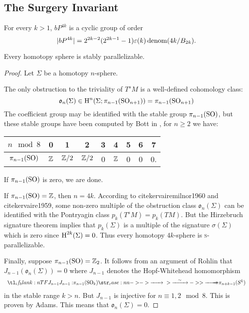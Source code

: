 \subsection{The Surgery Invariant}\label{sec:surgery-invariant}

\begin{theorem}\label{thm:kervaire-milnor}
	For every $k>1$, $bP^{4k}$ is a cyclic group of order
	\[
	  |bP^{4k}| =2^{2k-2}(2^{2k-1}-1)\varepsilon(k)\operatorname{denom}(4k/B_{2k}).
	\]
\end{theorem}

\begin{theorem}\label{thm:kervaire-invariant-problem}
\end{theorem}

\begin{theorem}\label{thm:homotopy-sphere-stably-parallelizable}
	Every homotopy sphere is stably parallelizable.
\end{theorem}
\begin{proof}
	Let $\Sigma$ be a homotopy $n$-sphere.

	The only obstruction to the triviality of $T^sM$ is a well-defined cohomology class:
	\[
		\mathfrak{o}_n(\Sigma) \in \operatorname{H}^n(\Sigma; \pi_{n-1}(\mathrm{SO}_{n+1})) = \pi_{n-1}(\mathrm{SO}_{n+1})
	\]
	The coefficient group may be identified with the stable group $\pi_{n-1}(\mathrm{SO})$, but these stable groups have been computed by Bott in \cite{bott1959stable}, for $n\geq 2$ we have:
	\begin{center}
		\begin{tabular}{c|cccccccc}
			\textrm{$n\mod 8$} & 0 & 1 & 2 & 3 & 4 & 5 & 6 & 7\\
			\hline
			$\pi_{n-1}(\mathrm{SO})$ & $\mathbb{Z}$ & $\mathbb{Z}/2$ & $\mathbb{Z}/2$ & 0 & $\mathbb{Z}$ & 0 & 0 & 0.
		\end{tabular}
	\end{center}
	If $\pi_{n-1}(\mathrm{SO})$ is zero, we are done. 

	If $\pi_{n-1}(\mathrm{SO}) = \mathbb{Z}$, then $n=4k$. According to cite{kervairemilnor1960} and cite{kervaire1959}, some non-zero multiple of the obstruction class $\mathfrak{o}_n(\Sigma)$ can be identified with the Pontryagin class $p_k(T^s M) = p_k(TM)$.  But the Hirzebruch signature theorem implies  that $p_k(\Sigma)$ is a multiple of the signature $\sigma(\Sigma)$ which is zero since $\operatorname{H}^{2k}(\Sigma)=0$. Thus every homotopy $4k$-sphere is \textsc{s}-parallelizable. 

	Finally, suppose $\pi_{n-1}(\mathrm{SO})= \mathbb{Z}_2$. It follows from an argument of Rohlin  that $J_{n-1}(\mathfrak{o}_n(\Sigma))=0$ where $J_{n-1}$ denotes the Hopf-Whitehead homomorphism
	\[
		\lkxfunc{J_{n-1}}{\pi_{n-1}(\SO_k)}{\pi_{n+k-1}(S^k)}
	\]
	in the stable range $k >n$. But $J_{n-1}$ is injective for $n\equiv 1, 2\mod 8$. This is proven by Adams.  This means that $\mathfrak{o}_n(\Sigma)=0$.
\end{proof}

